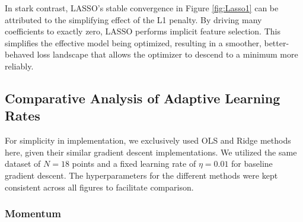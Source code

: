 \documentclass[twocolumn,aps]{revtex4}
\begin{document}
In stark contrast, LASSO's stable convergence in Figure \ref{fig:Lasso1} can be attributed to the simplifying effect of the L1 penalty. By driving many coefficients to exactly zero, LASSO performs implicit feature selection. 
This simplifies the effective model being optimized, resulting in a smoother, better-behaved loss landscape that allows the optimizer to descend to a minimum more reliably.

\subsection{Comparative Analysis of Adaptive Learning Rates}

For simplicity in implementation, we exclusively used OLS and Ridge methods here, given their similar gradient descent implementations. 
We utilized the same dataset of $N=18$ points and a fixed learning rate of $\eta=0.01$ for baseline gradient descent. 
The hyperparameters for the different methods were kept consistent across all figures to facilitate comparison.

\subsubsection{Momentum}
\end{document}
